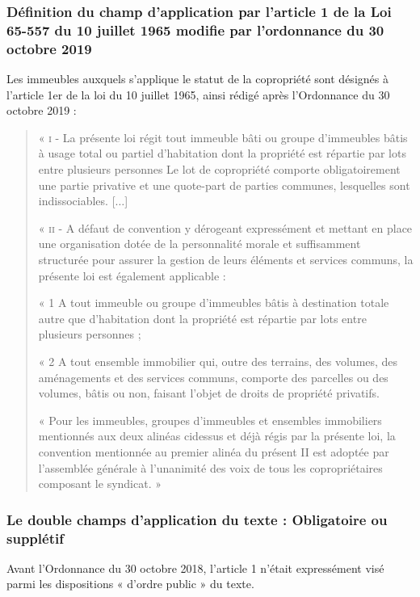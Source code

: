		\subsubsection{Définition du champ d’application par l’article 1 de la Loi 65-557 du 10 juillet 1965 modifie par l’ordonnance du 30 octobre 2019}
		Les immeubles auxquels s’applique le statut de la copropriété sont désignés à l'article 1er de la loi du 10
		juillet 1965, ainsi rédigé après l’Ordonnance du 30 octobre 2019 :
		\begin{quote}
			« \textsc{i} - La présente loi régit tout immeuble bâti ou groupe d’immeubles bâtis à usage total ou partiel
			d’habitation dont la propriété est répartie par lots entre plusieurs personnes
			Le lot de copropriété comporte obligatoirement une partie privative et une quote-part de parties
			communes, lesquelles sont indissociables. [$\dots$]
			
			« \textsc{ii} - A défaut de convention y dérogeant expressément et mettant en place une organisation dotée de
			la personnalité morale et suffisamment structurée pour assurer la gestion de leurs éléments et services
			communs, la présente loi est également applicable :
			
			« 1\degre{} A tout immeuble ou groupe d’immeubles bâtis à destination totale autre que d’habitation dont la
			propriété est répartie par lots entre plusieurs personnes ;
			
			« 2\degre{} A tout ensemble immobilier qui, outre des terrains, des volumes, des aménagements et des services
			communs, comporte des parcelles ou des volumes, bâtis ou non, faisant l’objet de droits de propriété
			privatifs.
			
			« Pour les immeubles, groupes d’immeubles et ensembles immobiliers mentionnés aux deux alinéas cidessus
			et déjà régis par la présente loi, la convention mentionnée au premier alinéa du présent II est
			adoptée par l’assemblée générale à l’unanimité des voix de tous les copropriétaires composant le
			syndicat. »
		\end{quote}
	
		\subsubsection{Le double champs d’application du texte : Obligatoire ou supplétif}
			Avant l’Ordonnance du 30 octobre 2018, l’article 1 n’était expressément visé parmi les
			dispositions « d’ordre public » du texte.
			
